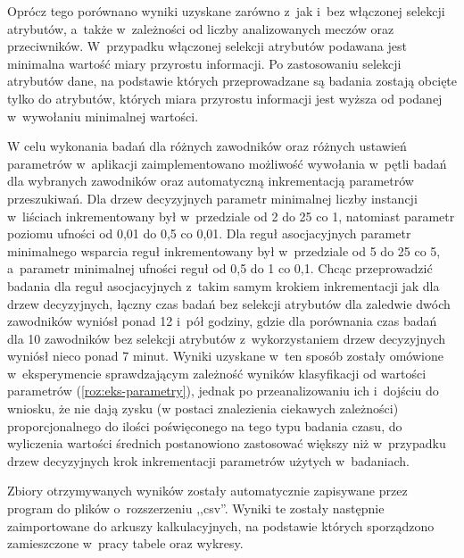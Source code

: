 \documentclass[a4paper,twoside,12pt]{book}
\begin{document}
Oprócz tego porównano wyniki uzyskane zarówno z~jak i~bez włączonej selekcji atrybutów, a~także w~zależności od liczby analizowanych meczów oraz przeciwników. W~przypadku włączonej selekcji atrybutów podawana jest minimalna wartość miary przyrostu informacji. Po zastosowaniu selekcji atrybutów dane, na podstawie których przeprowadzane są badania zostają obcięte tylko do atrybutów, których miara przyrostu informacji jest wyższa od podanej w~wywołaniu minimalnej wartości.

W celu wykonania badań dla różnych zawodników oraz różnych ustawień parametrów w~aplikacji zaimplementowano możliwość wywołania w~pętli badań dla wybranych zawodników oraz automatyczną inkrementacją parametrów przeszukiwań. Dla drzew decyzyjnych parametr minimalnej liczby instancji w~liściach inkrementowany był w~przedziale od 2 do 25 co 1, natomiast parametr poziomu ufności od 0,01 do 0,5 co 0,01. Dla reguł asocjacyjnych parametr minimalnego wsparcia reguł inkrementowany był w~przedziale od 5 do 25 co 5, a~parametr minimalnej ufności reguł od 0,5 do 1 co 0,1. Chcąc przeprowadzić badania dla reguł asocjacyjnych z~takim samym krokiem inkrementacji jak dla drzew decyzyjnych, łączny czas badań bez selekcji atrybutów dla zaledwie dwóch zawodników wyniósł ponad 12 i~pół godziny, gdzie dla porównania czas badań dla 10 zawodników bez selekcji atrybutów z~wykorzystaniem drzew decyzyjnych wyniósł nieco ponad 7 minut. Wyniki uzyskane w~ten sposób zostały omówione w~eksperymencie sprawdzającym zależność wyników klasyfikacji od wartości parametrów (\ref{roz:eks-parametry}), jednak po przeanalizowaniu ich i~dojściu do wniosku, że nie dają zysku (w postaci znalezienia ciekawych zależności) proporcjonalnego do ilości poświęconego na tego typu badania czasu, do wyliczenia wartości średnich postanowiono zastosować większy niż w~przypadku drzew decyzyjnych krok inkrementacji parametrów użytych w~badaniach. 

Zbiory otrzymywanych wyników zostały automatycznie zapisywane przez program do plików o~rozszerzeniu ,,csv''. Wyniki te zostały następnie zaimportowane do arkuszy kalkulacyjnych, na podstawie których sporządzono zamieszczone w~pracy tabele oraz wykresy. 
\end{document}
